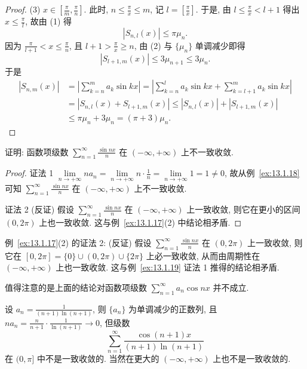 \begin{proof}
(3) $x\in\left[\frac{\pi}{m},\frac{\pi}{n}\right]$. 此时, $n\leqslant\frac{\pi}{x}\leqslant m$, 记 $l=\left[\frac{\pi}{x}\right]$. 于是, 由 $l\leqslant\frac{\pi}{x}<l+1$ 得出 $x\leqslant\frac{\pi}{l}$, 故由 (1) 得
\[
  |S_{n,l}(x)|\leqslant\pi\mu_{n}.
\]
因为 $\frac{\pi}{l+1}<x\leqslant\frac{\pi}{n}$, 且 $l+1>\frac{\pi}{x}\geqslant n$, 由 (2) 与 $\{\mu_{n}\}$ 单调减少即得
\[
  |S_{l+1,m}(x)|\leqslant3\mu_{n+1}\leqslant3\mu_{n}.
\]
于是
\[
  \begin{aligned}
    |S_{n,m}(x)|&=\left|\sum_{k=n}^{m}a_{k}\sin kx\right|=\left|\sum_{k=n}^{l}a_{k}\sin kx+\sum_{k=l+1}^{m}a_{k}\sin kx\right|\\
    &=|S_{n,l}(x)+S_{l+1,m}(x)|\leqslant|S_{n,l}(x)|+|S_{l+1,m}(x)|\\
    &\leqslant\pi\mu_{n}+3\mu_{n}=(\pi+3)\mu_{n}.
  \end{aligned}
\]
\end{proof}

\begin{example}\label{ex:13.1.19}
证明: 函数项级数 $\sum_{n=1}^{\infty}\frac{\sin nx}{n}$ 在 $(-\infty,+\infty)$ 上不一致收敛.
\end{example}

\begin{proof}
证法 1 $\lim\limits_{n\to+\infty}na_{n}=\lim\limits_{n\to+\infty}n\cdot\frac{1}{n}=\lim\limits_{n\to+\infty}1=1\neq0$, 故从例~\ref{ex:13.1.18} 可知 $\sum_{n=1}^{\infty}\frac{\sin nx}{n}$ 在 $(-\infty,+\infty)$ 上不一致收敛.

证法 2 (反证) 假设 $\sum_{n=1}^{\infty}\frac{\sin nx}{n}$ 在 $(-\infty,+\infty)$ 上一致收敛, 则它在更小的区间 $(0,2\pi)$ 上也一致收敛. 这与例~\ref{ex:13.1.17}(2) 中结论相矛盾.
\end{proof}

\begin{remark}\label{rem:13.1.3}
例~\ref{ex:13.1.17}(2) 的证法 2: (反证) 假设 $\sum_{n=1}^{\infty}\frac{\sin nx}{n}$ 在 $(0,2\pi)$ 上一致收敛, 则它在 $[0,2\pi]=\{0\}\cup(0,2\pi)\cup\{2\pi\}$ 上必一致收敛, 从而由周期性在 $(-\infty,+\infty)$ 上也一致收敛. 这与例~\ref{ex:13.1.19} 证法 1 推得的结论相矛盾.
\end{remark}

值得注意的是上面的结论对函数项级数 $\sum_{n=1}^{\infty}a_{n}\cos nx$ 并不成立.

\begin{example}\label{ex:13.1.20}
设 $a_{n}=\frac{1}{(n+1)\ln(n+1)}$, 则 $\{a_{n}\}$ 为单调减少的正数列, 且 $na_{n}=\frac{n}{n+1}\cdot\frac{1}{\ln(n+1)}\to0$, 但级数
\[
  \sum_{n=1}^{\infty}\frac{\cos(n+1)x}{(n+1)\ln(n+1)}
\]
在 $(0,\pi]$ 中不是一致收敛的. 当然在更大的 $(-\infty,+\infty)$ 上也不是一致收敛的.
\end{example}

